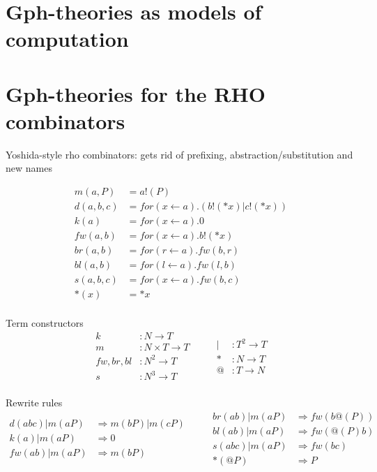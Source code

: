 \documentclass{llncs}
\begin{document}
\section{Gph-theories as models of computation}

\section{Gph-theories for the RHO combinators}
Yoshida-style rho combinators: gets rid of prefixing,
abstraction/substitution and new names

\[\begin{array}{rl}
  m(a,P) &= a!(P) \\
  d(a,b,c) &= for(x \leftarrow a).(b!(*x) | c!(*x)) \\
  k(a) &= for(x \leftarrow a).0 \\ 
  fw(a,b) &= for(x \leftarrow a).b!(*x) \\
  br(a,b) &= for(r \leftarrow a).fw(b,r) \\
  bl(a,b) &= for(l \leftarrow a).fw(l,b) \\
  s(a,b,c) &= for(x \leftarrow a).fw(b,c) \\
  *(x) &= *x \\  
\end{array}\]

Term constructors
\[\begin{array}{rl}
  k &: N \to T \\
  m &: N \times T \to T \\
  fw,br,bl &: N^2 \to T \\
  s &: N^3 \to T \\
\end{array} \quad \quad
\begin{array}{rl}
  | &: T^2 \to T \\
  * &: N \to T \\
  @ &: T \to N \\
\end{array}\]

Rewrite rules
\[\begin{array}{rl}
  d(abc) | m(aP) & \Rightarrow m(bP) | m(cP) \\
  k(a) | m(aP) & \Rightarrow 0 \\
  fw(ab) | m(aP) & \Rightarrow m(bP) \\
\end{array} \quad \quad
\begin{array}{rl}
  br(ab) | m(aP) & \Rightarrow fw(b@(P)) \\
  bl(ab) | m(aP) & \Rightarrow fw(@(P)b) \\
  s(abc) | m(aP) & \Rightarrow fw(bc) \\
  *(@P) & \Rightarrow P \\
\end{array}\]
\end{document}
